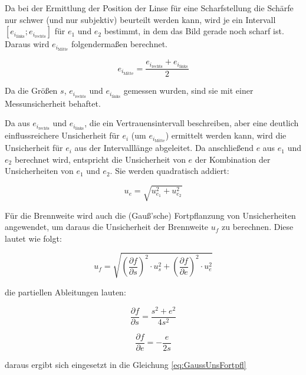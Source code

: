 \documentclass[a4paper,12pt]{article}
\begin{document}
Da bei der Ermittlung der Position der Linse für eine Scharfstellung die Schärfe nur schwer (und nur subjektiv)
beurteilt werden kann, wird je ein Intervall $[e_{i_\mathrm{links}};e_{i_\mathrm{rechts}}]$ für $e_1$ und
$e_2$ bestimmt, in dem das Bild gerade noch scharf ist. Daraus wird $e_{i_\mathrm{Mitte}}$ folgendermaßen berechnet.

\begin{equation}
    \label{eq:BesselAbstandIntervall}
    e_{i_\mathrm{Mitte}} = \frac{e_{i_\mathrm{rechts}} + e_{i_\mathrm{links}}}{2}
\end{equation}

Da die Größen $s$, $e_{i_\mathrm{rechts}}$ und $e_{i_\mathrm{links}}$ gemessen wurden, sind sie mit einer
Messunsicherheit behaftet. 

Da aus $e_{i_\mathrm{rechts}}$ und $e_{i_\mathrm{links}}$, die ein Vertrauensintervall beschreiben, aber eine
deutlich einflussreichere Unsicherheit für $e_i$ (um $e_{i_\mathrm{Mitte}}$) ermittelt werden kann, wird die Unsicherheit
für $e_i$ aus der Intervalllänge abgeleitet.
Da anschließend $e$ aus $e_1$ und $e_2$ berechnet wird, entspricht die Unsicherheit von $e$ der Kombination der
Unsicherheiten von $e_1$ und $e_2$.
Sie werden quadratisch addiert:


\begin{equation}
    \label{eq:UnkorrUnsFortpfl}
    u_e=\sqrt{u_{e_1}^2+u_{e_2}^2}
\end{equation}

Für die Brennweite wird auch die (Gauß'sche) Fortpflanzung von Unsicherheiten angewendet,
um daraus die Unsicherheit der Brennweite $u_f$ zu berechnen. Diese lautet wie folgt:

\begin{equation}
    \label{eq:GaussUnsFortpfl}
    u_f = \sqrt{\left(\frac{\partial f}{\partial s}\right)^2 \cdot u_s^2 + \left(\frac{\partial f}{\partial e}\right)^2 \cdot u_e^2}
\end{equation}

die partiellen Ableitungen lauten:

\begin{equation}
    \frac{\partial f}{\partial s} = \frac{s^2+e^2}{4s^2}
\end{equation}

\begin{equation}
    \frac{\partial f}{\partial e} = -\frac{e}{2s}
\end{equation}

daraus ergibt sich eingesetzt in die Gleichung \ref{eq:GaussUnsFortpfl}
\end{document}
